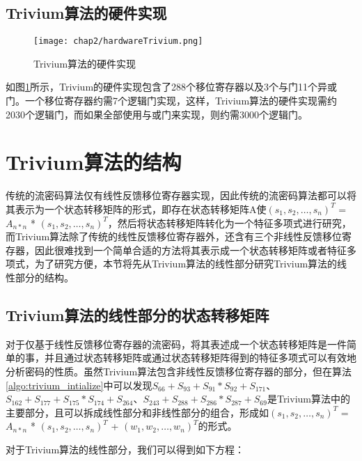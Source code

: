 \subsection{Trivium算法的硬件实现}

\begin{figure}[H]
	\centering
	\texttt{[image: chap2/hardwareTrivium.png]}
	\caption{Trivium算法的硬件实现}\label{fig:Trivium算法的硬件实现}
\end{figure}

如图\ref{fig:Trivium算法的硬件实现}所示，Trivium的硬件实现包含了288个移位寄存器以及3个与门11个异或门。一个移位寄存器约需7个逻辑门实现，这样，Trivium算法的硬件实现需约2030个逻辑门，而如果全部使用与或门来实现，则约需3000个逻辑门。

\section{Trivium算法的结构}

传统的流密码算法仅有线性反馈移位寄存器实现，因此传统的流密码算法都可以将其表示为一个状态转移矩阵的形式，即存在状态转移矩阵A使$(s_{1}, s_{2}, \ldots, s_{n})^{T}$ = $A_{n*n}$ * $(s_{1}, s_{2}, \ldots, s_{n})^{T}$，然后将状态转移矩阵转化为一个特征多项式进行研究，而Trivium算法除了传统的线性反馈移位寄存器外，还含有三个非线性反馈移位寄存器，因此很难找到一个简单合适的方法将其表示成一个状态转移矩阵或者特征多项式，为了研究方便，本节将先从Trivium算法的线性部分研究Trivium算法的线性部分的结构。

\subsection{Trivium算法的线性部分的状态转移矩阵}

对于仅基于线性反馈移位寄存器的流密码，将其表述成一个状态转移矩阵是一件简单的事，并且通过状态转移矩阵或通过状态转移矩阵得到的特征多项式可以有效地分析密码的性质。虽然Trivium算法包含非线性反馈移位寄存器的部分，但在算法\ref{algo:trivium_intialize}中可以发现$S_{66} + S_{93} + S_{91} * S_{92} + S_{171}$、$S_{162} + S_{177} + S_{175} * S_{174} + S_{264}$、$S_{243} + S_{288} + S_{286} * S_{287} + S_{69}$是Trivium算法中的主要部分，且可以拆成线性部分和非线性部分的组合，形成如$(s_{1}, s_{2}, \ldots, s_{n})^{T}$ = $A_{n*n}$ * $(s_{1}, s_{2}, \ldots, s_{n})^{T}$ + $(w_{1}, w_{2}, \ldots, w_{n})^{T}$的形式。

对于Trivium算法的线性部分，我们可以得到如下方程：

